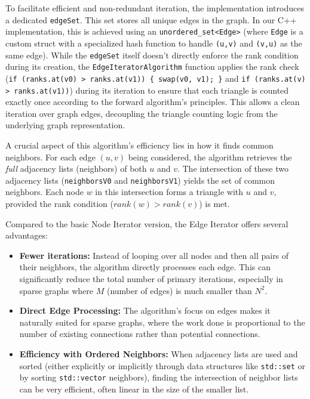 \documentclass{aes2e}
\begin{document}
To facilitate efficient and non-redundant iteration, the implementation introduces a dedicated \texttt{edgeSet}. This set stores all unique edges in the graph. In our C++ implementation, this is achieved using an \texttt{unordered\_set<Edge>} (where \texttt{Edge} is a custom struct with a specialized hash function to handle \texttt{(u,v)} and \texttt{(v,u)} as the same edge). While the \texttt{edgeSet} itself doesn't directly enforce the rank condition during its creation, the \texttt{EdgeIteratorAlgorithm} function applies the rank check (\texttt{if (ranks.at(v0) > ranks.at(v1)) \{ swap(v0, v1); \}} and \texttt{if (ranks.at(v) > ranks.at(v1))}) during its iteration to ensure that each triangle is counted exactly once according to the forward algorithm's principles. This allows a clean iteration over graph edges, decoupling the triangle counting logic from the underlying graph representation.

A crucial aspect of this algorithm's efficiency lies in how it finds common neighbors. For each edge $(u, v)$ being considered, the algorithm retrieves the \textit{full} adjacency lists (neighbors) of both $u$ and $v$. The intersection of these two adjacency lists (\texttt{neighborsV0} and \texttt{neighborsV1}) yields the set of common neighbors. Each node $w$ in this intersection forms a triangle with $u$ and $v$, provided the rank condition ($rank(w) > rank(v)$) is met.

Compared to the basic Node Iterator version, the Edge Iterator offers several advantages:

\begin{itemize}
    \item \textbf{Fewer iterations:} Instead of looping over all nodes and then all pairs of their neighbors, the algorithm directly processes each edge. This can significantly reduce the total number of primary iterations, especially in sparse graphs where $M$ (number of edges) is much smaller than $N^2$.
    \item \textbf{Direct Edge Processing:} The algorithm's focus on edges makes it naturally suited for sparse graphs, where the work done is proportional to the number of existing connections rather than potential connections.
    \item \textbf{Efficiency with Ordered Neighbors:} When adjacency lists are used and sorted (either explicitly or implicitly through data structures like \texttt{std::set} or by sorting \texttt{std::vector} neighbors), finding the intersection of neighbor lists can be very efficient, often linear in the size of the smaller list.
\end{itemize}
\end{document}
